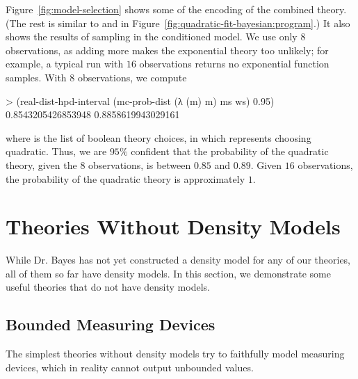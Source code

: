 Figure~\ref{fig:model-selection} shows some of the encoding of the combined theory.
(The rest is similar to  and  in Figure~\ref{fig:quadratic-fit-bayesian:program}.)
It also shows the results of sampling in the conditioned model.
We use only $8$ observations, as adding more makes the exponential theory too unlikely; for example, a typical run with $16$ observations returns no exponential function samples.
With $8$ observations, we compute
\begin{center}\singlespacing
\begin{schemedisplay}
> (real-dist-hpd-interval
   (mc-prob-dist (λ (m) m) ms ws)
   0.95)
0.8543205426853948
0.8858619943029161
\end{schemedisplay}
\end{center}
where  is the list of boolean theory choices, in which  represents choosing quadratic.
Thus, we are $95\%$ confident that the probability of the quadratic theory, given the $8$ observations, is between $0.85$ and $0.89$.
Given $16$ observations, the probability of the quadratic theory is approximately $1$.


\section{Theories Without Density Models}

While Dr. Bayes has not yet constructed a density model for any of our theories, all of them so far have density models.
In this section, we demonstrate some useful theories that do not have density models.

\subsection{Bounded Measuring Devices}

The simplest theories without density models try to faithfully model measuring devices, which in reality cannot output unbounded values.


